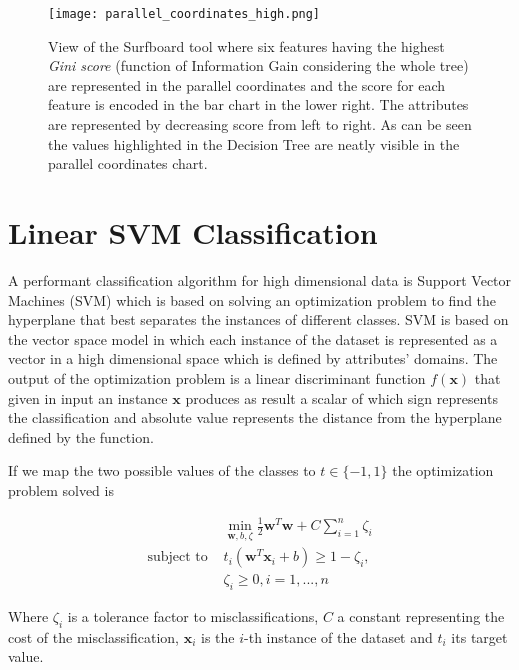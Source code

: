 \documentclass{article}
\begin{document}
\begin{figure}
\centering
\texttt{[image: parallel\_coordinates\_high.png]} \\
\caption{View of the Surfboard tool where six features
    having the highest \emph{Gini score} (function of Information Gain
    considering the whole tree) are represented in the parallel coordinates
and the score for each feature is encoded in the bar chart in the lower right.
The attributes are represented by decreasing score from left to right.
As can be seen the values highlighted in the Decision Tree are neatly visible
in the parallel coordinates chart.}
\label{fig:parallel}
\end{figure}


\section{Linear SVM Classification}

A performant classification algorithm for high dimensional data is Support
Vector Machines (SVM) which is based on solving an optimization problem to find
the hyperplane that best separates the instances of different classes.
SVM is based on the vector space model in which each instance of the dataset
is represented as a vector in a high dimensional space which is defined
by attributes' domains. The output of the
optimization problem is a linear discriminant function $f(\mathbf{x})$
that given in input an instance $\mathbf{x}$ produces as result a scalar of
which sign represents the classification and absolute value represents the
distance from the hyperplane defined by the function.

If we map the two possible values of the classes to $t \in \{-1, 1\}$ 
the optimization problem solved is

\begin{equation}
    \begin{split}
        & \min_ {\mathbf{w}, b, \zeta} \frac{1}{2} \mathbf{w}^T \mathbf{w} + C
\sum_{i=1}^{n} \zeta_i\\
\textrm{subject to } & t_i(\mathbf{w}^T \mathbf{x}_i + b) \geq 1 - \zeta_i,\\
                       & \zeta_i \geq 0, i=1, ..., n
\end{split}
\end{equation}

Where $\zeta_i$ is a tolerance factor to misclassifications, $C$ a constant
representing the cost of the misclassification, $\mathbf{x}_i$ is the $i$-th
instance of the dataset and $t_i$ its target value.
\end{document}
